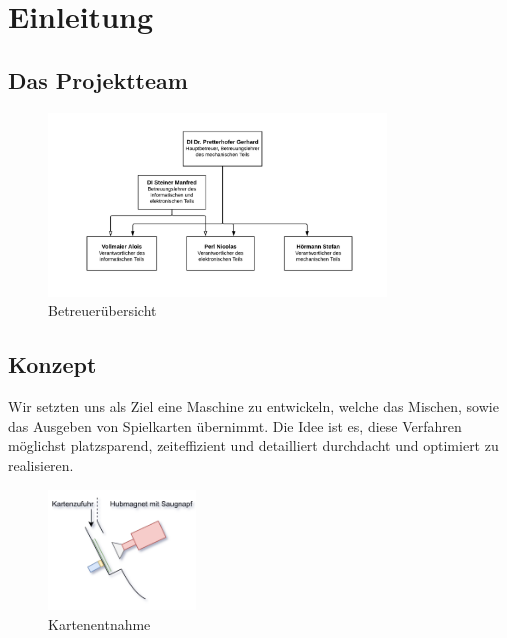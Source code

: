 

\chapter{Einleitung}

\section{Das Projektteam}
\label{sec:Einleitung}

\begin{figure}[H]
    \vspace{-30pt}
    \includegraphics[width=0.80\textwidth]{fig/Hierachie_Reshuffled.pdf}
    \caption{Betreuerübersicht}
    \label{Bild über ganze Seitenbreite}
\end{figure}


\section{Konzept}
Wir setzten uns als Ziel eine Maschine zu entwickeln, welche das Mischen, sowie das Ausgeben von Spielkarten übernimmt.
Die Idee ist es, diese Verfahren möglichst platzsparend, zeiteffizient und detailliert durchdacht und optimiert zu realisieren.\\

\begin{figure}
    \vspace{-40pt}
    \begin{center}
        \includegraphics[width=0.35\textwidth]{fig/Reshuffled_Version_3_prinzip}
    \end{center}
    \caption{Kartenentnahme}
    \label{Kartenentnahme}
    \vspace{-15pt}
\end{figure}


